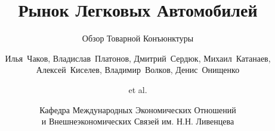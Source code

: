 \title[Экономическая Конъюнктура] %
{Рынок Легковых Автомобилей}

\subtitle{Обзор Товарной Конъюнктуры}

\author[4-МЭО-5] %
    {Илья~Чаков, 
    Владислав~Платонов,
    Дмитрий~Сердюк,
    Михаил~Катанаев,
    Алексей~Киселев,
    Владимир~Волков,
    Денис~Онищенко \and et al.
    }


\date[Ноябрь 2024] %
{Кафедра Международных Экономических Отношений \\
и Внешнеэкономических Связей им. Н.Н. Ливенцева}